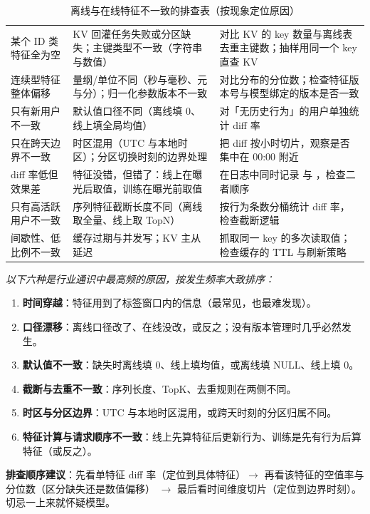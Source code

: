 \begin{table}[htbp]
\centering
\caption{离线与在线特征不一致的排查表（按现象定位原因）}
\label{tab:feat-diff-debug}
\small
\begin{tabularx}{\textwidth}{L{3.3cm} L{4.1cm} Y}
\toprule
{} &  &  \\
\midrule
某个 ID 类特征全为空 & KV 回灌任务失败或分区缺失；主键类型不一致（字符串与数值） &
对比 KV 的 key 数量与离线表去重主键数；抽样用同一个 key 直查 KV \\
\addlinespace
连续型特征整体偏移 & 量纲/单位不同（秒与毫秒、元与分）；归一化参数版本不一致 &
对比分布的分位数；检查特征版本号与模型绑定的版本是否一致 \\
\addlinespace
只有新用户不一致 & 默认值口径不同（离线填 0、线上填全局均值） &
对「无历史行为」的用户单独统计 diff 率 \\
\addlinespace
只在跨天边界不一致 & 时区混用（UTC 与本地时区）；分区切换时刻的边界处理 &
把 diff 按小时切片，观察是否集中在 00:00 附近 \\
\addlinespace
diff 率低但效果差 & 特征没错，但错了：线上在曝光后取值，训练在曝光前取值 &
在日志中同时记录  与 ，检查二者顺序 \\
\addlinespace
只有高活跃用户不一致 & 序列特征截断长度不同（离线取全量、线上取 TopN） &
按行为条数分桶统计 diff 率，检查截断逻辑 \\
\addlinespace
间歇性、低比例不一致 & 缓存过期与并发写；KV 主从延迟 &
抓取同一 key 的多次读取值；检查缓存的 TTL 与刷新策略 \\
\bottomrule
\end{tabularx}
\end{table}

\begin{pitfall}[离线在线不一致的六种典型场景]
\emph{以下六种是行业通识中最高频的原因，按发生频率大致排序：}
\begin{enumerate}
  \item \textbf{时间穿越}：特征用到了标签窗口内的信息（最常见，也最难发现）。
  \item \textbf{口径漂移}：离线口径改了、在线没改，或反之；没有版本管理时几乎必然发生。
  \item \textbf{默认值不一致}：缺失时离线填 0、线上填均值，或离线填 NULL、线上填 0。
  \item \textbf{截断与去重不一致}：序列长度、TopK、去重规则在两侧不同。
  \item \textbf{时区与分区边界}：UTC 与本地时区混用，或跨天时刻的分区归属不同。
  \item \textbf{特征计算与请求顺序不一致}：线上先算特征后更新行为、训练是先有行为后算特征（或反之）。
\end{enumerate}
\textbf{排查顺序建议}：先看单特征 diff 率（定位到具体特征）$\to$ 再看该特征的空值率与分位数（区分缺失还是数值偏移）
$\to$ 最后看时间维度切片（定位到边界时刻）。切忌一上来就怀疑模型。
\end{pitfall}


